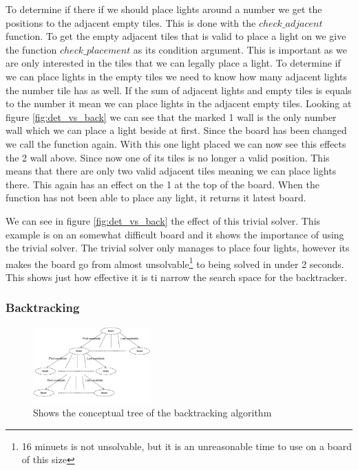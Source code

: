 \documentclass[12pt]{article}
\begin{document}
To determine if there if we should place lights around a number we get the positions to the adjacent empty tiles. This is done with the $check\_adjacent$ function. To get the empty adjacent tiles that is valid to place a light on we give the function $check\_placement$ as its condition argument. This is important as we are only interested in the tiles that we can legally place a light. To determine if we can place lights in the empty tiles we need to know how many adjacent lights the number tile has as well. If the sum of adjacent lights and empty tiles is equals to the number it mean we can place lights in the adjacent empty tiles. Looking at figure \ref{fig:det_vs_back} we can see that the marked 1 wall is the only number wall which we can place a light beside at first. Since the board has been changed we call the function again. With this one light placed we can now see this effects the 2 wall above. Since now one of its tiles is no longer a valid position. This means that there are only two valid adjacent tiles meaning we can place lights there. This again has an effect on the 1 at the top of the board. When the function has not been able to place any light, it returns it latest board.


We can see in figure \ref{fig:det_vs_back} the effect of this trivial solver. This example is on an somewhat difficult board and it shows the importance of using the trivial solver. The trivial solver only manages to place four lights, however its makes the board go from almost unsolvable\footnote{ 16 minuets is not unsolvable, but it is an unreasonable time to use on a board of this size } to being solved in under 2 seconds. This shows just how effective it is ti narrow the search space for the backtracker.


\newpage

\subsubsection{Backtracking}\label{backtracking}
\begin{figure}
\begin{center}
    \centering
    \includegraphics[width=0.4\textwidth]{doc/backtracking_tree.png}
    \caption{Shows the conceptual tree of the backtracking algorithm}
    \label{fig:tree}
    \end{center}
\end{figure}
\end{document}
